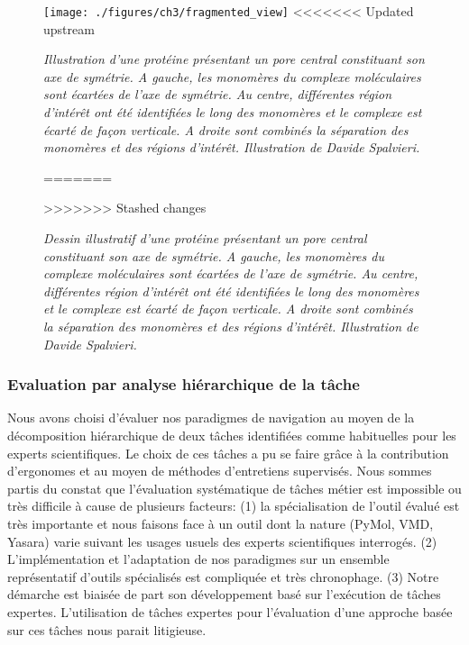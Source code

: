 \begin{figure}[h]
  \centering
  {\texttt{[image: ./figures/ch3/fragmented\_view]}}
<<<<<<< Updated upstream
    \caption{{\it Illustration d'une protéine présentant un pore central constituant son axe de symétrie. A gauche, les monomères du complexe moléculaires sont écartées de l'axe de symétrie. Au centre, différentes région d'intérêt ont été identifiées le long des monomères et le complexe est écarté de façon verticale. A droite sont combinés la séparation des monomères et des régions d'intérêt. Illustration de Davide Spalvieri.}}
=======
    \caption[Dessin illustratif d'une protéine présentant un pore central constituant son axe de symétrie.]{{\it Dessin illustratif d'une protéine présentant un pore central constituant son axe de symétrie. A gauche, les monomères du complexe moléculaires sont écartées de l'axe de symétrie. Au centre, différentes région d'intérêt ont été identifiées le long des monomères et le complexe est écarté de façon verticale. A droite sont combinés la séparation des monomères et des régions d'intérêt. Illustration de Davide Spalvieri.}}
>>>>>>> Stashed changes
  \label{Fig:fragmented_view}
  \hspace{0.2cm}
\end{figure}


\subsubsection{Evaluation par analyse hiérarchique de la tâche} \label{hta_eval}

Nous avons choisi d'évaluer nos paradigmes de navigation au moyen de la décomposition hiérarchique de deux tâches identifiées comme habituelles pour les experts scientifiques. Le choix de ces tâches a pu se faire grâce à la contribution d'ergonomes et au moyen de méthodes d'entretiens supervisés.
Nous sommes partis du constat que l'évaluation systématique de tâches métier est impossible ou très difficile à cause de plusieurs facteurs: (1) la spécialisation de l'outil évalué est très importante et nous faisons face à un outil dont la nature (PyMol, VMD, Yasara) varie suivant les usages usuels des experts scientifiques interrogés. (2) L'implémentation et l'adaptation de nos paradigmes sur un ensemble représentatif d'outils spécialisés est compliquée et très chronophage. (3) Notre démarche est biaisée de part son développement basé sur l'exécution de tâches expertes. L'utilisation de tâches expertes pour l'évaluation d'une approche basée sur ces tâches nous parait litigieuse. 

